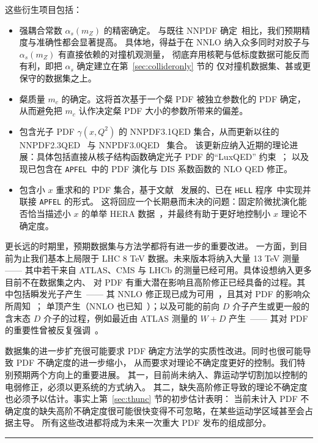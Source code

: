 这些衍生项目包括：
\begin{itemize}
\item 强耦合常数 $\alpha_s(m_Z)$ 的精密确定。
%
与既往 NNPDF 确定~\cite{Lionetti:2011pw,Ball:2011us}相比，我们预期精度与准确性都会显著提高。
具体地，得益于在 NNLO 纳入众多同时对胶子与 $\alpha_s(m_Z)$ 有直接依赖的对撞机观测量，
彻底弃用核靶与低标度数据可能反而有利，即把 $\alpha_s$ 确定建立在第~\ref{sec:collideronly} 节的
仅对撞机数据集、甚或更保守的数据集之上。
\item 粲质量 $m_c$ 的确定。这将首次基于一个粲 PDF 被独立参数化的 PDF 确定，
从而避免把 $m_c$ 认作决定粲 PDF 大小的参数所带来的偏差。
\item 包含光子 PDF $\gamma(x,Q^2)$ 的 NNPDF3.1QED 集合，从而更新以往的
  NNPDF2.3QED~\cite{Ball:2013hta} 与 NNPDF3.0QED~\cite{Bertone:2016ume} 集合。
  该更新应纳入近期的理论进展：具体包括直接从核子结构函数确定光子 PDF 的“LuxQED”
  约束~\cite{Manohar:2016nzj}；
以及现已包含在 {\tt APFEL}~\cite{Bertone:2013vaa}中的 PDF 演化与 DIS 系数函数的 NLO QED 修正。
\item 包含小 $x$ 重求和的 PDF 集合，基于文献~\cite{Altarelli:2005ni,Ball:2007ra,Altarelli:2008aj}
发展的、已在 {\tt HELL} 程序~\cite{Bonvini:2016wki}中实现并联接 {\tt APFEL} 的形式。
%
这将回应一个长期悬而未决的问题：固定阶微扰演化能否恰当描述小 $x$ 的单举 HERA
数据~\cite{Caola:2010cy,Caola:2009iy}，并最终有助于更好地控制小 $x$ 理论不确定度。
\end{itemize}

更长远的时期里，预期数据集与方法学都将有进一步的重要改进。
一方面，到目前为止我们基本上局限于 LHC 8 TeV 数据。未来版本将纳入大量 13 TeV 测量——
其中若干来自 ATLAS、CMS 与 LHCb 的测量已经可用。具体设想纳入更多目前不在数据集之内、
对 PDF 有重大潜在影响且高阶修正已经具备的过程。其中包括瞬发光子产生~\cite{Aaboud:2017cbm}——
其 NNLO 修正现已成为可用~\cite{Campbell:2016lzl}，且其对 PDF 的影响众所周知~\cite{d'Enterria:2012yj}；
单顶产生（NNLO 也已知~\cite{Brucherseifer:2014ama}）；以及可能的前向 $D$ 介子产生或更一般的含末态
$D$ 介子的过程，例如最近由 ATLAS 测量的 $W+D$ 产生~\cite{Aad:2014xca}——
其对 PDF 的重要性曾被反复强调~\cite{Zenaiev:2015rfa,Gauld:2015yia,Gauld:2016kpd}。

数据集的进一步扩充很可能要求 PDF 确定方法学的实质性改进。同时也很可能导致 PDF 不确定度的进一步缩小，
从而要求对理论不确定度更好的控制。我们特别预期两个方向上的重要进展。
其一，目前尚未纳入、靠运动学切割加以控制的电弱修正，必须以更系统的方式纳入。
其二，缺失高阶修正导致的理论不确定度也必须予以估计。事实上第~\ref{sec:thunc} 节的初步估计表明：
当前未计入 PDF 不确定度的缺失高阶不确定度很可能很快变得不可忽略，在某些运动学区域甚至会占据主导。
所有这些改进都将成为未来一次重大 PDF 发布的组成部分。

\bigskip
\bigskip
\begin{center}
\rule{5cm}{.1pt}
\end{center}
\bigskip
\bigskip
